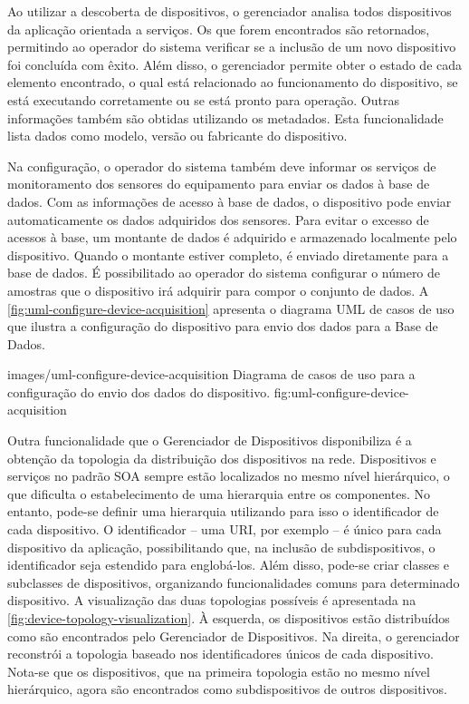 Ao utilizar a descoberta de dispositivos, o gerenciador analisa todos dispositivos da aplicação
orientada a serviços. Os que forem encontrados são retornados, permitindo ao operador do sistema
verificar se a inclusão de um novo dispositivo foi concluída com êxito. Além disso, o gerenciador
permite obter o estado de cada elemento encontrado, o qual está relacionado ao funcionamento do
dispositivo, se está executando corretamente ou se está pronto para operação. Outras informações
também são obtidas utilizando os metadados. Esta funcionalidade lista dados como modelo, versão ou
fabricante do dispositivo.

Na configuração, o operador do sistema também deve informar os serviços de monitoramento dos
sensores do equipamento para enviar os dados à base de dados. Com as informações de acesso à base de
dados, o dispositivo pode enviar automaticamente os dados adquiridos dos sensores. Para evitar o
excesso de acessos à base, um montante de dados é adquirido e armazenado localmente pelo
dispositivo. Quando o montante estiver completo, é enviado diretamente para a base de dados. É
possibilitado ao operador do sistema configurar o número de amostras que o dispositivo irá adquirir
para compor o conjunto de dados. A \cref{fig:uml-configure-device-acquisition} apresenta o diagrama
\gls{UML} de casos de uso que ilustra a configuração do dispositivo para envio dos dados para a Base
de Dados.

  {images/uml-configure-device-acquisition}
  {Diagrama de casos de uso para a configuração do envio dos dados do dispositivo.}
  {fig:uml-configure-device-acquisition}

Outra funcionalidade que o Gerenciador de Dispositivos disponibiliza é a obtenção da topologia da
distribuição dos dispositivos na rede. Dispositivos e serviços no padrão \gls{SOA} sempre estão
localizados no mesmo nível hierárquico, o que dificulta o estabelecimento de uma hierarquia entre os
componentes. No entanto, pode-se definir uma hierarquia utilizando para isso o identificador de cada
dispositivo. O identificador -- uma \gls{URI}, por exemplo -- é único para cada dispositivo da
aplicação, possibilitando que, na inclusão de subdispositivos, o identificador seja estendido para
englobá-los. Além disso, pode-se criar classes e subclasses de dispositivos, organizando
funcionalidades comuns para determinado dispositivo. A visualização das duas topologias possíveis é
apresentada na \cref{fig:device-topology-visualization}. À esquerda, os dispositivos estão
distribuídos como são encontrados pelo Gerenciador de Dispositivos. Na direita, o gerenciador
reconstrói a topologia baseado nos identificadores únicos de cada dispositivo. Nota-se que os
dispositivos, que na primeira topologia estão no mesmo nível hierárquico, agora são encontrados como
subdispositivos de outros dispositivos.

